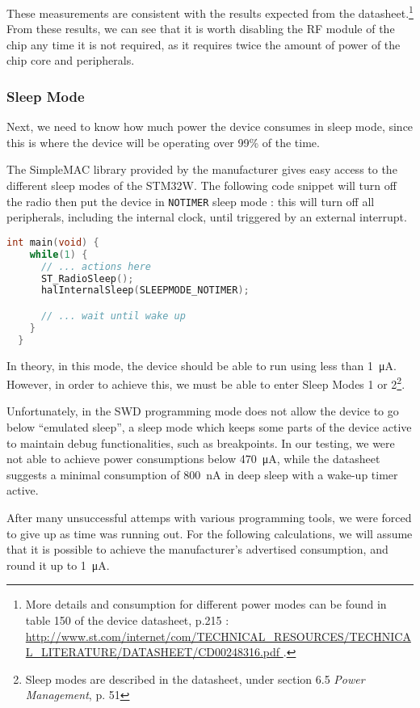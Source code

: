 These measurements are consistent with the results expected from the
datasheet.\footnote{ More details and consumption for different power modes can
be found in table 150 of the device datasheet, p.215 : \url{
http://www.st.com/internet/com/TECHNICAL_RESOURCES/TECHNICAL_LITERATURE/DATASHEET/CD00248316.pdf
}.} From these results, we can see that it is worth disabling the RF module
of the chip any time it is not required, as it requires twice the amount of
power of the chip core and peripherals. 

\subsubsection{Sleep Mode}\label{sub2:sleep-mode}

Next, we need to know how much power the device consumes in sleep mode, since
this is where the device will be operating over 99\% of the time. 

The SimpleMAC library provided by the manufacturer gives easy access to the
different sleep modes of the STM32W. The following code snippet will turn off
the radio then put the device in \texttt{NOTIMER} sleep mode : this will turn
off all peripherals, including the internal clock, until triggered by an
external interrupt.

\begin{lstlisting}[language=C,caption=Code snippet for deep sleep mode]
  int main(void) {
    while(1) {
      // ... actions here
      ST_RadioSleep();
      halInternalSleep(SLEEPMODE_NOTIMER);

      // ... wait until wake up
    }
  }
\end{lstlisting}

In theory, in this mode, the device should be able to run using less than
\SI{1}{\micro\ampere}. However, in order to achieve this, we must be able to
enter Sleep Modes 1 or 2\footnote{Sleep modes are described in the datasheet,
under section 6.5 \emph{Power Management}, p. 51}.

Unfortunately, in the SWD programming mode does not allow the device to go below
``emulated sleep'', a sleep mode which keeps some parts of the device active to
maintain debug functionalities, such as breakpoints. In our testing, we were not
able to achieve power consumptions below \SI{470}{\micro\ampere}, while the
datasheet suggests a minimal consumption of \SI{800}{nA} in deep sleep with
a wake-up timer active.

After many unsuccessful attemps with various programming tools, we were forced
to give up as time was running out. For the following calculations, we will
assume that it is possible to achieve the manufacturer's advertised consumption,
and round it up to \SI{1}{\micro\ampere}.

